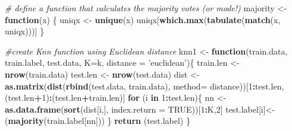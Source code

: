 \documentclass[
]{article}
\newenvironment{Shaded}{\begin{snugshade}}{\end{snugshade}}
\newcommand{\CommentTok}[1]{\textcolor[rgb]{0.56,0.35,0.01}{\textit{#1}}}
\newcommand{\ControlFlowTok}[1]{\textcolor[rgb]{0.13,0.29,0.53}{\textbf{#1}}}
\newcommand{\DataTypeTok}[1]{\textcolor[rgb]{0.13,0.29,0.53}{#1}}
\newcommand{\DecValTok}[1]{\textcolor[rgb]{0.00,0.00,0.81}{#1}}
\newcommand{\KeywordTok}[1]{\textcolor[rgb]{0.13,0.29,0.53}{\textbf{#1}}}
\newcommand{\NormalTok}[1]{#1}
\newcommand{\OperatorTok}[1]{\textcolor[rgb]{0.81,0.36,0.00}{\textbf{#1}}}
\newcommand{\OtherTok}[1]{\textcolor[rgb]{0.56,0.35,0.01}{#1}}
\newcommand{\StringTok}[1]{\textcolor[rgb]{0.31,0.60,0.02}{#1}}
\begin{document}
\begin{Shaded}
\begin{Highlighting}[]
\CommentTok{# define a function that calculates the majority votes (or mode!)}
\NormalTok{majority <-}\StringTok{ }\ControlFlowTok{function}\NormalTok{(x) \{}
\NormalTok{   uniqx <-}\StringTok{ }\KeywordTok{unique}\NormalTok{(x)}
\NormalTok{   uniqx[}\KeywordTok{which.max}\NormalTok{(}\KeywordTok{tabulate}\NormalTok{(}\KeywordTok{match}\NormalTok{(x, uniqx)))]}
\NormalTok{\}}

\CommentTok{#create Knn function using Euclidean distance }
\NormalTok{knn1 <-}\StringTok{ }\ControlFlowTok{function}\NormalTok{(train.data, train.label, test.data, }\DataTypeTok{K=}\NormalTok{k, }\DataTypeTok{distance =} \StringTok{'euclidean'}\NormalTok{)\{}
\NormalTok{    train.len <-}\StringTok{ }\KeywordTok{nrow}\NormalTok{(train.data)}
\NormalTok{    test.len <-}\StringTok{ }\KeywordTok{nrow}\NormalTok{(test.data)}
\NormalTok{    dist <-}\StringTok{ }\KeywordTok{as.matrix}\NormalTok{(}\KeywordTok{dist}\NormalTok{(}\KeywordTok{rbind}\NormalTok{(test.data, train.data), }\DataTypeTok{method=}\NormalTok{ distance))[}\DecValTok{1}\OperatorTok{:}\NormalTok{test.len, (test.len}\OperatorTok{+}\DecValTok{1}\NormalTok{)}\OperatorTok{:}\NormalTok{(test.len}\OperatorTok{+}\NormalTok{train.len)]}
    \ControlFlowTok{for}\NormalTok{ (i }\ControlFlowTok{in} \DecValTok{1}\OperatorTok{:}\NormalTok{test.len)\{}
\NormalTok{        nn <-}\StringTok{ }\KeywordTok{as.data.frame}\NormalTok{(}\KeywordTok{sort}\NormalTok{(dist[i,], }\DataTypeTok{index.return =} \OtherTok{TRUE}\NormalTok{))[}\DecValTok{1}\OperatorTok{:}\NormalTok{K,}\DecValTok{2}\NormalTok{]}
\NormalTok{        test.label[i]<-}\StringTok{ }\NormalTok{(}\KeywordTok{majority}\NormalTok{(train.label[nn]))}
\NormalTok{    \}}
    \KeywordTok{return}\NormalTok{ (test.label)}
\NormalTok{\}}
\end{Highlighting}
\end{Shaded}
\end{document}
